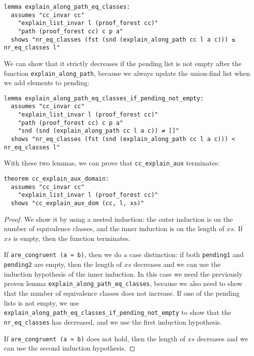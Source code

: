\begin{lstlisting}
lemma explain_along_path_eq_classes:
  assumes "cc_invar cc"
    "explain_list_invar l (proof_forest cc)"
    "path (proof_forest cc) c p a"
  shows "nr_eq_classes (fst (snd (explain_along_path cc l a c))) ≤ nr_eq_classes l"
\end{lstlisting}

We can show that it strictly decreases if the pending list is not empty after the function  \lstinline{explain_along_path}, because we always update the union-find list when we add elements to pending:

\begin{lstlisting}
lemma explain_along_path_eq_classes_if_pending_not_empty:
  assumes "cc_invar cc"
    "explain_list_invar l (proof_forest cc)"
    "path (proof_forest cc) c p a"
    "snd (snd (explain_along_path cc l a c)) ≠ []"
  shows "nr_eq_classes (fst (snd (explain_along_path cc l a c))) < nr_eq_classes l"
\end{lstlisting}

With these two lemmas, we can prove that \lstinline{cc_explain_aux} terminates:

\begin{lstlisting}
theorem cc_explain_aux_domain:
  assumes "cc_invar cc"
    "explain_list_invar l (proof_forest cc)"
  shows "cc_explain_aux_dom (cc, l, xs)"
\end{lstlisting}


\begin{proof}
We show it by using a nested induction: the outer induction is on the number of equivalence classes, and the inner induction is on the length of $xs$.
If $xs$ is empty, then the function terminates.

If \lstinline{are_congruent (a ≈ b)}, then we do a case distinction: if both \lstinline{pending1} and \lstinline{pending2} are empty, then the length of $xs$ decreases and we can use the induction hypothesis of the inner induction. In this case we need the previously proven lemma \lstinline{explain_along_path_eq_classes}, because we also need to show that the number of equivalence classes does not increase. If one of the pending lists is not empty, we use \lstinline{explain_along_path_eq_classes_if_pending_not_empty} to show that the \lstinline{nr_eq_classes} has decreased, and we use the first induction hypothesis.

If \lstinline{are_congruent (a ≈ b)} does not hold, then the length of $xs$ decreases and we can use the second induction hypothesis.
\end{proof}


